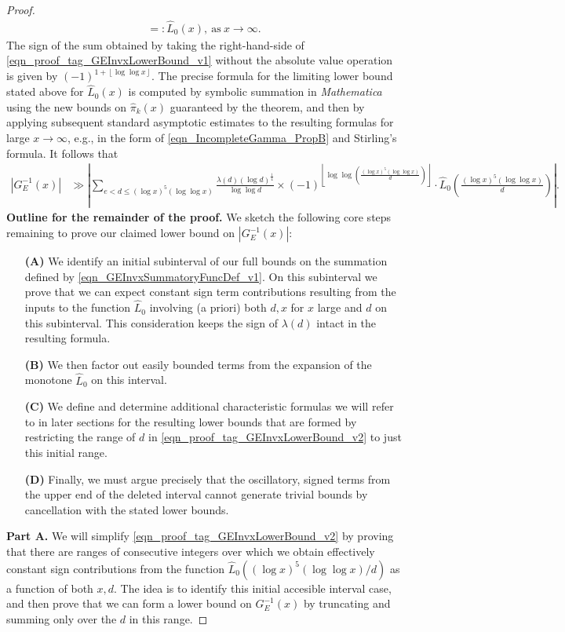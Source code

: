 \documentclass[11pt,reqno,a4letter]{article}
\numberwithin{figure}{section}
\numberwithin{table}{section}
\newcommand{\floor}[1]{\left\lfloor #1 \right\rfloor}
\theoremstyle{plain}
\numberwithin{theorem}{section}
\theoremstyle{definition}
\begin{document}
\begin{proof}
\begin{align}
     =: \widehat{L}_0(x), \mathrm{\ as\ } x \rightarrow \infty. 
\end{align} 
The sign of the sum obtained by taking the right-hand-side of 
\eqref{eqn_proof_tag_GEInvxLowerBound_v1} without the 
absolute value operation is given by $(-1)^{1+\floor{\log\log x}}$. 
The precise formula for the 
limiting lower bound stated above for $\widehat{L}_0(x)$ is computed by symbolic summation 
in \emph{Mathematica} using the new bounds on $\widehat{\pi}_k(x)$ guaranteed by 
the theorem, and then by applying subsequent standard asymptotic estimates to the 
resulting formulas for large $x \rightarrow \infty$, e.g., 
in the form of \eqref{eqn_IncompleteGamma_PropB} and Stirling's formula. 
It follows that 
\begin{align} 
\label{eqn_proof_tag_GEInvxLowerBound_v2} 
|G_E^{-1}(x)| & \gg \left\lvert \sum_{e < d \leq (\log x)^{5} (\log\log x)} 
     \frac{\lambda(d) (\log d)^{\frac{1}{4}}}{\log\log d} \times 
     (-1)^{\floor{\log\log\left(\frac{(\log x)^{5} (\log\log x)}{d}\right)}} \cdot 
     \widehat{L}_0\left(\frac{(\log x)^{5} (\log\log x)}{d}\right) \right\rvert. 
\end{align} 
\textbf{Outline for the remainder of the proof.} 
We sketch the following core steps remaining to prove our claimed lower bound on 
$|G_E^{-1}(x)|$: 
\begin{itemize}[itemsep=0pt,topsep=4pt,leftmargin=0.75in] 
\item[\textbf{(A)}] We identify an initial subinterval of our full bounds 
     on the summation defined by 
     \eqref{eqn_GEInvxSummatoryFuncDef_v1}. 
     On this subinterval we prove that we can expect 
     constant sign term contributions resulting from the inputs to the function $\widehat{L}_0$ 
     involving (a priori) both $d,x$ for $x$ large and $d$ on this subinterval. 
     This consideration keeps the sign of $\lambda(d)$ intact 
     in the resulting formula. 
\item[\textbf{(B)}] We then factor out easily bounded terms from the expansion of the 
     monotone $\widehat{L}_0$ on this interval. 
\item[\textbf{(C)}] We define and determine additional characteristic formulas we will 
     refer to in later sections for the resulting lower bounds that are formed by 
     restricting the range of $d$ in 
     \eqref{eqn_proof_tag_GEInvxLowerBound_v2} 
     to just this initial range. 
\item[\textbf{(D)}] Finally, we must argue precisely 
     that the oscillatory, signed terms from the upper end of the deleted interval 
     cannot generate trivial bounds by cancellation with the stated lower bounds. 
\end{itemize} 
\textbf{Part A.} 
We will simplify \eqref{eqn_proof_tag_GEInvxLowerBound_v2} by proving that there are 
ranges of consecutive integers over which we obtain 
effectively constant sign contributions from the 
function $\widehat{L}_0((\log x)^{5} (\log\log x) / d)$ as a function of both $x,d$. 
The idea is to identify this initial accesible interval case, and then prove that we can 
form a lower bound on $G_E^{-1}(x)$ by truncating and summing only over the $d$ in this range. 


\end{proof}
\end{document}
